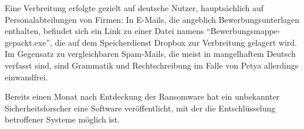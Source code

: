 Eine Verbreitung erfolgte gezielt auf deutsche Nutzer, hauptsächlich auf Personalabteilungen von Firmen: In E-Mails, die angeblich Bewerbungsunterlagen enthalten, befindet sich ein Link zu einer Datei namens "`Bewerbungsmappe-gepackt.exe"', die auf dem Speicherdienst Dropbox zur Verbreitung gelagert wird. \cite{petya:infect} \\
Im Gegensatz zu vergleichbaren Spam-Mails, die meist in mangelhaftem Deutsch verfasst sind, sind Grammatik und Rechtschreibung im Falle von Petya allerdings einwandfrei.

Bereits einen Monat nach Entdeckung der Ransomware hat ein unbekannter Sicherheitsforscher eine Software veröffentlicht, mit der die Entschlüsselung betroffener Systeme möglich ist. \cite{petya:end}







